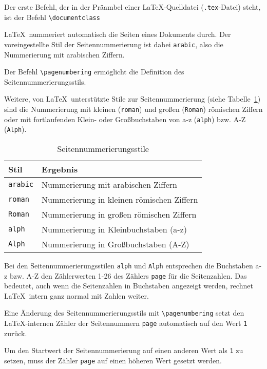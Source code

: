 Der erste Befehl, der in der Präambel einer \LaTeX-Quelldatei (\verb!.tex!-Datei) steht, ist der Befehl \verb!\documentclass!
\begin{document}
\LaTeX\ nummeriert automatisch 
die Seiten eines Dokuments durch. Der voreingestellte
Stil der Seitennummerierung ist dabei 
\verb!arabic!, also die Nummerierung mit
arabischen Ziffern.

Der Befehl \verb!\pagenumbering! ermöglicht die Definition des Seitennummerierungsstils.


Weitere, von \LaTeX\ unterstützte
Stile zur Seitennummerierung (siehe Tabelle~\ref{Tabelle_Nummerierungsstilarten})
sind die Nummerierung mit kleinen (\verb!roman!) und großen (\verb!Roman!) römischen Ziffern 
oder mit fortlaufenden Klein- oder 
Großbuchstaben von a-z (\verb!alph!) bzw. A-Z (\verb!Alph!).



\begin{table}[h!tb]
\centering
\caption{Seitennummerierungsstile}
\label{Tabelle_Nummerierungsstilarten}       %
\begin{tabular}{ll}
\hline
Stil & Ergebnis \\
\hline
\texttt{arabic} & Nummerierung mit arabischen Ziffern \\
\texttt{roman} & Nummerierung in kleinen römischen Ziffern \\
\texttt{Roman} & Nummerierung in großen römischen Ziffern \\
\texttt{alph} & Nummerierung in Kleinbuchstaben (a-z) \\
\texttt{Alph} & Nummerierung in Großbuchstaben (A-Z) \\
\hline
\end{tabular}
\end{table}

Bei den Seitennummerierungsstilen \verb!alph! und \verb!Alph!
entsprechen die Buchstaben a-z bzw. A-Z den Zählerwerten 1-26 des Zählers \verb!page! für
die Seitenzahlen. Das bedeutet, auch wenn die Seitenzahlen in Buchstaben
angezeigt werden, rechnet \LaTeX\ intern ganz normal mit Zahlen weiter. 

Eine Änderung des Seitennummerierungsstils 
mit \verb!\pagenumbering! setzt den \LaTeX-internen Zähler der 
Seitennummern \verb!page! automatisch 
auf den Wert \verb!1! zurück.

Um den Startwert der Seitennummerierung 
auf einen anderen Wert als \texttt{1} zu setzen, muss der Zähler
\texttt{page} auf einen höheren 
Wert gesetzt werden. 
\end{document}
